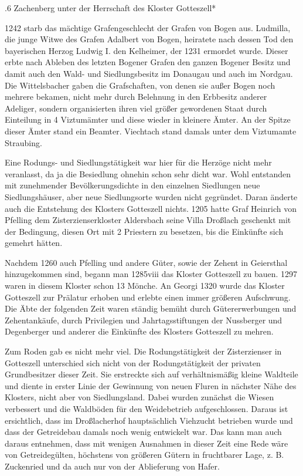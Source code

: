 .6 Zachenberg unter der Herrschaft des Kloster Gotteszell*

1242 starb das mächtige Grafengeschlecht der Grafen von Bogen aus. Ludmilla, die
junge Witwe des Grafen Adalbert von Bogen, heiratete nach dessen Tod den
bayerischen Herzog Ludwig I. den Kelheimer, der 1231 ermordet wurde. Dieser
erbte nach Ableben des letzten Bogener Grafen den ganzen Bogener Besitz und
damit auch den Wald- und Siedlungsbesitz im Donaugau und auch im Nordgau. Die
Wittelsbacher gaben die Grafschaften, von denen sie außer Bogen noch mehrere
bekamen, nicht mehr durch Belehnung in den Erbbesitz anderer Adeliger, sondern
organisierten ihren viel größer gewordenen Staat durch Einteilung in 4
Viztumämter und diese wieder in kleinere Ämter. An der Spitze dieser Ämter stand
ein Beamter. Viechtach stand damals unter dem Viztumamte Straubing.

Eine Rodungs- und Siedlungstätigkeit war hier für die Herzöge nicht mehr
veranlasst, da ja die Besiedlung ohnehin schon sehr dicht war. Wohl entstanden
mit zunehmender Bevölkerungsdichte in den einzelnen Siedlungen neue
Siedlungshäuser, aber neue Siedlungsorte wurden nicht gegründet. Daran änderte
auch die Entstehung des Klosters Gotteszell nichts. 1205 hatte Graf Heinrich von
Pfelling dem Zisterzienserkloster Aldersbach seine Villa Droßlach geschenkt mit
der Bedingung, diesen Ort mit 2 Priestern zu besetzen, bis die Einkünfte sich
gemehrt hätten.

Nachdem 1260 auch Pfelling und andere Güter, sowie der Zehent in Geiersthal
hinzugekommen sind, begann man 1285viii das Kloster Gotteszell zu bauen. 1297
waren in diesem Kloster schon 13 Mönche. An Georgi 1320 wurde das Kloster
Gotteszell zur Prälatur erhoben und erlebte einen immer größeren Aufschwung. Die
Äbte der folgenden Zeit waren ständig bemüht durch Gütererwerbungen und
Zehentankäufe, durch Privilegien und Jahrtagsstiftungen der Nussberger und
Degenberger und anderer die Einkünfte des Klosters Gotteszell zu mehren.

Zum Roden gab es nicht mehr viel. Die Rodungstätigkeit der Zisterzienser in
Gotteszell unterschied sich nicht von der Rodungstätigkeit der privaten
Grundbesitzer dieser Zeit. Sie erstreckte sich auf verhältnismäßig kleine
Waldteile und diente in erster Linie der Gewinnung von neuen Fluren in nächster
Nähe des Klosters, nicht aber von Siedlungsland. Dabei wurden zunächst die
Wiesen verbessert und die Waldböden für den Weidebetrieb aufgeschlossen. Daraus
ist ersichtlich, dass im Droßlacherhof hauptsächlich Viehzucht betrieben wurde
und dass der Getreidebau damals noch wenig entwickelt war. Das kann man auch
daraus entnehmen, dass mit wenigen Ausnahmen in dieser Zeit eine Rede wäre von
Getreidegülten, höchstens von größeren Gütern in fruchtbarer Lage, z. B.
Zuckenried und da auch nur von der Ablieferung von Hafer.

